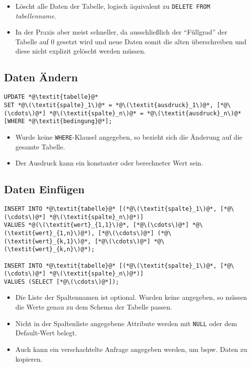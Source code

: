 				\begin{itemize}
					\item Löscht alle Daten der Tabelle, logisch äquivalent zu \lstinline|DELETE FROM| \textit{tabellenname}.
					\item In der Praxis aber meist schneller, da ausschließlich der \enquote{Füllgrad} der Tabelle auf 0 gesetzt wird und neue Daten somit die alten überschreiben und diese nicht explizit gelöscht werden müssen.
				\end{itemize}

		\subsection{Daten Ändern} %
			\begin{lstlisting}
UPDATE *@\textit{tabelle}@*
SET *@\(\textit{spalte}_1\)@* = *@\(\textit{ausdruck}_1\)@*, [*@\(\cdots\)@*] *@\(\textit{spalte}_n\)@* = *@\(\textit{ausdruck}_n\)@*
[WHERE *@\textit{bedingung}@*];
            \end{lstlisting}

			\begin{itemize}
				\item Wurde keine \lstinline|WHERE|-Klausel angegeben, so bezieht sich die Änderung auf die gesamte Tabelle.
				\item Der Ausdruck kann ein konstanter oder berechneter Wert sein.
			\end{itemize}

		\subsection{Daten Einfügen} %
			\begin{lstlisting}
INSERT INTO *@\textit{tabelle}@* [(*@\(\textit{spalte}_1\)@*, [*@\(\cdots\)@*] *@\(\textit{spalte}_n\)@*)]
VALUES *@(\(\textit{wert}_{1,1}\)@*, [*@\(\cdots\)@*] *@\(\textit{wert}_{1,n}\)@*), [*@\(\cdots\)@*] (*@\(\textit{wert}_{k,1}\)@*, [*@\(\cdots\)@*] *@\(\textit{wert}_{k,n}\)@*);

INSERT INTO *@\textit{tabelle}@* [(*@\(\textit{spalte}_1\)@*, [*@\(\cdots\)@*] *@\(\textit{spalte}_n\)@*)]
VALUES (SELECT [*@\(\cdots\)@*]);
            \end{lstlisting}

			\begin{itemize}
				\item Die Liste der Spaltennamen ist optional. Wurden keine angegeben, so müssen die Werte genau zu dem Schema der Tabelle passen.
				\item Nicht in der Spaltenliste angegebene Attribute werden mit \lstinline|NULL| oder dem Default-Wert belegt.
				\item Auch kann ein verschachtelte Anfrage angegeben werden, um bspw. Daten zu kopieren.
			\end{itemize}

